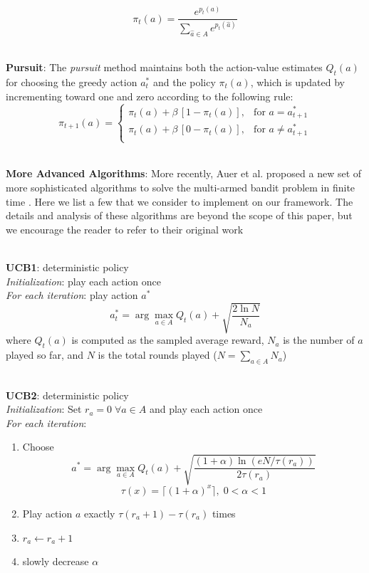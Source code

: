 \documentclass[conference]{IEEEtran}
\begin{document}
\begin{equation*}
	\pi_t(a) = \frac{e^{p_t(a)}}{\sum_{\hat{a} \in A}e^{p_t(\hat{a})}}
\end{equation*}

\-\\
\textbf{Pursuit}: The \emph{pursuit} method maintains both the action-value estimates $Q_t(a)$ for choosing the greedy action $a^*_t$ and the policy $\pi_t(a)$, which is updated by incrementing toward one and zero according to the following rule:
\begin{equation*}
	\pi_{t+1}(a) = 
	\begin{cases}
		\pi_{t}(a) + \beta\,\left[1-\pi_{t}(a)\right],& \text{for } a = a^*_{t+1}\\
		\pi_{t}(a) + \beta\,\left[0-\pi_{t}(a)\right],& \text{for } a \neq a^*_{t+1}\\
	\end{cases}
\end{equation*}

\-\\
\textbf{More Advanced Algorithms}: More recently, Auer et al. proposed a new set of more sophisticated algorithms to solve the multi-armed bandit problem in finite time \cite{auer2002}. Here we list a few that we consider to implement on our framework. The details and analysis of these algorithms are beyond the scope of this paper, but we encourage the reader to refer to their original work \cite{auer2002}

\-\\
\textbf{UCB1}: deterministic policy\\
\emph{Initialization}: play each action once\\
\emph{For each iteration}: play action $a^*$
\begin{equation*}
	a^*_t = \arg\max_{a \in A} Q_t(a) + \sqrt{\frac{2\ln N}{N_a}}
\end{equation*}
\noindent where $Q_t(a)$ is computed as the sampled average reward, $N_a$ is the number of $a$ played so far, and $N$ is the total rounds played ($N = \sum_{a \in A} N_a$)

\-\\
\textbf{UCB2}: deterministic policy\\
\emph{Initialization}: Set $r_a = 0\;\forall a \in A$ and play each action once\\
\emph{For each iteration}: 
\begin{enumerate}
	\item Choose 
	\begin{equation*}
		a^* = \arg\max_{a \in A} Q_t(a) + \sqrt{\frac{(1 + \alpha)\ln(e N /\tau(r_a))}{2 \tau(r_a)}}
	\end{equation*}
	\begin{equation*}
		\tau(x) = \lceil(1+\alpha)^x\rceil,\;0<\alpha<1
	\end{equation*}
	\item Play action $a$ exactly $\tau(r_a + 1) - \tau(r_a)$ times
	\item $r_a \leftarrow r_a + 1$
	\item slowly decrease $\alpha$
\end{enumerate}
\end{document}
